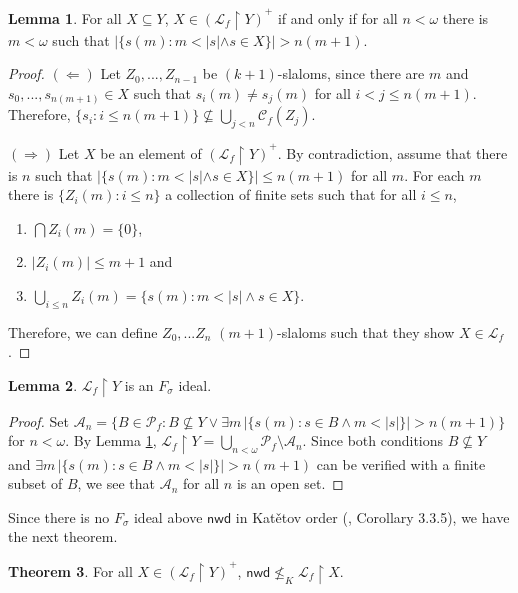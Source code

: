 \documentclass{amsart}
\theoremstyle{definition}
\newtheorem{theorem}{Theorem}[section]
\newtheorem{lemma}[theorem]{Lemma}
\theoremstyle{remark}
\numberwithin{equation}{section}
\newcommand{\nwd}{\mathsf{nwd}}
\newcommand{\lf}{\mathcal{L}_f}
\begin{document}
\begin{lemma}\label{positive f sigma}
    For all $X\subseteq Y$, $X\in (\lf\upharpoonright Y)^+$ if and only if for all $n<\omega$ there is $m<\omega$  such that $|\{s(m):m<|s| \wedge s\in X\}|>n(m+1)$.
\end{lemma}
\begin{proof}
$(\Leftarrow)$ Let $Z_0,...,Z_{n-1}$ be $(k+1)$-slaloms, since there are $m$ and\\ $s_0,...,s_{n(m+1)}\in X$ such that  $s_i(m)\neq s_j(m)$ for all $i<j\leq n(m+1)$. Therefore, $\{s_i:i\leq n(m+1)\}\not\subseteq \bigcup_{j<n} \mathcal{C}_f(Z_j)$.


$(\Rightarrow)$ Let $X$ be an element of $(\lf\upharpoonright Y)^+$. By contradiction, assume that there is $n$ such that $|\{s(m):m<|s| \wedge s\in X\}|\leq n(m+1)$ for all $m$. For each $m$ there is $\{Z_i(m):i\leq n\}$ a collection of finite sets such that for all $i\leq n$,
        \begin{enumerate}
            \item $\bigcap Z_i(m)=\{0\}$,
            \item $|Z_i(m)|\leq m+1$ and
            \item $\bigcup_{i\leq n}Z_i(m)=\{s(m):m<|s| \wedge s\in X\}$.
        \end{enumerate}
Therefore, we can define $Z_0,...Z_n$ $(m+1)$-slaloms such that they show $X\in \lf$.
\end{proof}

\begin{lemma}\label{restriccion fsigma}
    $\lf\upharpoonright Y$ is an $F_\sigma$ ideal.
\end{lemma}

\begin{proof}
    Set $\mathcal{A}_n=\{B\in \mathcal{P}_f: B\not\subseteq Y \vee  \exists m \, |\{s(m):s\in B \wedge m<|s| \}|> n(m+1) \}$ for $n<\omega$. By Lemma \ref{positive f sigma}, $\lf\upharpoonright Y= \bigcup_{n<\omega} \mathcal{P}_f\setminus \mathcal{A}_n$. Since both conditions $B\not\subseteq Y$ and $\exists m \, |\{s(m):s\in B \wedge m<|s| \}|> n(m+1)$ can be verified with a finite subset of $B$, we see that  $\mathcal{A}_n$ for all $n$ is an open set. 
\end{proof}

Since there is no $F_\sigma$ ideal above $\nwd$ in Kat\v{e}tov order (\cite{meza}, Corollary 3.3.5), we have the next theorem.

\begin{theorem}
For all $X\in (\lf\upharpoonright Y)^+$, $\nwd \not\leq_K \lf\upharpoonright X$.   
\end{theorem}
\end{document}
